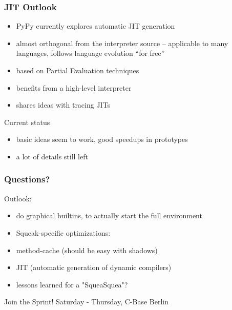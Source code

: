 \documentclass[utf8x]{beamer}
\begin{document}
\begin{frame}
    \frametitle{JIT Outlook}
    \begin{itemize}
    \item PyPy currently explores automatic JIT generation
    \item almost orthogonal from the interpreter source – applicable to many
          languages, follows language evolution ``for free''
    \item based on Partial Evaluation techniques
    \item benefits from a high-level interpreter
    \item shares ideas with tracing JITs
    \end{itemize}
    \pause
    \begin{block} {Current status}
        \begin{itemize}
        \item basic ideas seem to work, good speedups in prototypes
        \item a lot of details still left
        \end{itemize}
    \end{block}
\end{frame}

\begin{frame}
  \frametitle{Questions?}
  Outlook:
  \begin{itemize}
  \item do graphical builtins, to actually start the full environment
  \item Squeak-specific optimizations:
  \item method-cache (should be easy with shadows)
  \item JIT (automatic generation of dynamic compilers)
  \item lessons learned for a "SqueaSquea"?
  \end{itemize}
  \bigskip
  \begin{block}{
    Join the Sprint!}
    \bigskip
    \hskip 1cm Saturday - Thursday, C-Base Berlin
    \bigskip
  \end{block}
\end{frame}
\end{document}
